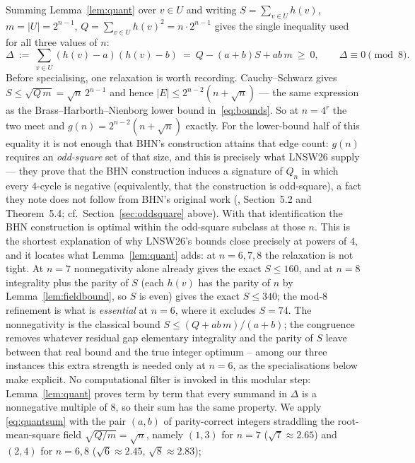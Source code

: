 \documentclass[12pt,a4paper]{article}
\theoremstyle{definition}
\begin{document}
Summing Lemma~\ref{lem:quant} over $v\in U$ and writing
$S=\sum_{v\in U}h(v)$, $m=|U|=2^{n-1}$, $Q=\sum_{v\in U}h(v)^2=n\cdot2^{n-1}$
gives the single inequality used for all three values of $n$:
\begin{equation}\label{eq:quantsum}
\Delta \ :=\ \sum_{v\in U}(h(v)-a)(h(v)-b)\ =\ Q-(a+b)S+ab\,m
\ \ge\ 0,
\qquad \Delta\equiv0\!\!\pmod 8 .
\end{equation}
Before specialising, one relaxation is worth recording. Cauchy--Schwarz gives
$S\le\sqrt{Q\,m}=\sqrt n\,2^{n-1}$ and hence
$|E|\le2^{n-2}(n+\sqrt n)$ --- the same expression as the
Brass--Harborth--Nienborg lower bound in~\eqref{eq:bounds}. So at $n=4^r$
the two meet and $g(n)=2^{n-2}(n+\sqrt n)$ exactly. For the lower-bound
half of this equality it is not enough that BHN's construction attains
that edge count: $g(n)$ requires an \emph{odd-square} set of that size,
and this is precisely what LNSW26 supply --- they prove that the BHN
construction induces a signature of $Q_n$ in which every $4$-cycle is
negative (equivalently, that the construction is odd-square), a fact they
note does not follow from BHN's original work (\cite{LNSW26},
Section~5.2 and Theorem~5.4; cf.\ Section~\ref{sec:oddsquare} above). With
that identification the BHN construction is optimal within the odd-square
subclass at those $n$. This is the shortest explanation of why
LNSW26's bounds close precisely at powers of $4$, and it locates what
Lemma~\ref{lem:quant} adds: at $n=6,7,8$ the relaxation is not tight. At
$n=7$ nonnegativity alone already gives the exact $S\le160$, and at $n=8$
integrality plus the parity of $S$ (each $h(v)$ has the parity of $n$ by
Lemma~\ref{lem:fieldbound}, so $S$ is even) gives the exact $S\le340$; the
mod-$8$ refinement is what is \emph{essential} at $n=6$, where it excludes
$S=74$.
The nonnegativity is the classical bound $S\le(Q+ab\,m)/(a+b)$; the
congruence removes whatever residual gap elementary integrality and the
parity of $S$ leave between that real bound and the true integer optimum
-- among our three instances this extra strength is needed only at $n=6$,
as the specialisations below make explicit. No computational filter is invoked in this modular
step: Lemma~\ref{lem:quant} proves term by term that every summand in
$\Delta$ is a nonnegative multiple of $8$, so their sum has the same property. We apply \eqref{eq:quantsum} with the pair
$(a,b)$ of parity-correct integers straddling the root-mean-square field
$\sqrt{Q/m}=\sqrt n$, namely $(1,3)$ for $n=7$ ($\sqrt7\approx2.65$)
and $(2,4)$ for $n=6,8$ ($\sqrt6\approx2.45$, $\sqrt8\approx2.83$);
\end{document}
